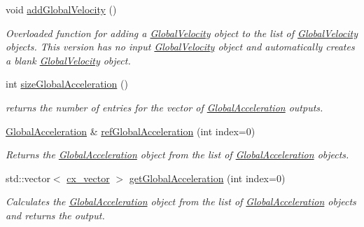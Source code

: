 \begin{DoxyCompactItemize}
\hypertarget{classosea_1_1ofreq_1_1_outputs_body_a07a548f3df9fa5aff4223a60f5f1b56c}{void \hyperlink{classosea_1_1ofreq_1_1_outputs_body_a07a548f3df9fa5aff4223a60f5f1b56c}{add\-Global\-Velocity} ()}\label{classosea_1_1ofreq_1_1_outputs_body_a07a548f3df9fa5aff4223a60f5f1b56c}

\begin{DoxyCompactList}\small\item\em Overloaded function for adding a \hyperlink{classosea_1_1ofreq_1_1_global_velocity}{Global\-Velocity} object to the list of \hyperlink{classosea_1_1ofreq_1_1_global_velocity}{Global\-Velocity} objects. This version has no input \hyperlink{classosea_1_1ofreq_1_1_global_velocity}{Global\-Velocity} object and automatically creates a blank \hyperlink{classosea_1_1ofreq_1_1_global_velocity}{Global\-Velocity} object. \end{DoxyCompactList}\item 
int \hyperlink{classosea_1_1ofreq_1_1_outputs_body_a4265e0ece0f65f6ee6b3e36fc66bf960}{size\-Global\-Acceleration} ()
\begin{DoxyCompactList}\small\item\em returns the number of entries for the vector of \hyperlink{classosea_1_1ofreq_1_1_global_acceleration}{Global\-Acceleration} outputs. \end{DoxyCompactList}\item 
\hyperlink{classosea_1_1ofreq_1_1_global_acceleration}{Global\-Acceleration} \& \hyperlink{classosea_1_1ofreq_1_1_outputs_body_a7be24ef361c2dcd9c6b9c62d58ee34bd}{ref\-Global\-Acceleration} (int index=0)
\begin{DoxyCompactList}\small\item\em Returns the \hyperlink{classosea_1_1ofreq_1_1_global_acceleration}{Global\-Acceleration} object from the list of \hyperlink{classosea_1_1ofreq_1_1_global_acceleration}{Global\-Acceleration} objects. \end{DoxyCompactList}\item 
std\-::vector$<$ \hyperlink{namespaceosea_1_1ofreq_a42bf1d8bbba99693142c4184486ad3e0}{cx\-\_\-vector} $>$ \hyperlink{classosea_1_1ofreq_1_1_outputs_body_a9c4de0023e30be8e03c4f910a3848bdc}{get\-Global\-Acceleration} (int index=0)
\begin{DoxyCompactList}\small\item\em Calculates the \hyperlink{classosea_1_1ofreq_1_1_global_acceleration}{Global\-Acceleration} object from the list of \hyperlink{classosea_1_1ofreq_1_1_global_acceleration}{Global\-Acceleration} objects and returns the output. \end{DoxyCompactList}\item 

\end{DoxyCompactItemize}
